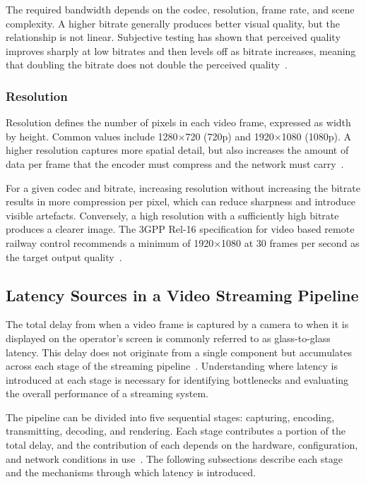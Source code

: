 The required bandwidth depends on the codec, resolution, frame rate, and scene complexity. A higher bitrate generally produces better visual quality, but the relationship is not linear. Subjective testing has shown that perceived quality improves sharply at low bitrates and then levels off as bitrate increases, meaning that doubling the bitrate does not double the perceived quality~\cite{pinson2012}.
 
\subsubsection{Resolution}\label{subsubsec:resolution}
Resolution defines the number of pixels in each video frame, expressed as width by height. Common values include 1280$\times$720 (720p) and 1920$\times$1080 (1080p). A higher resolution captures more spatial detail, but also increases the amount of data per frame that the encoder must compress and the network must carry~\cite{pinson2012}.
 
For a given codec and bitrate, increasing resolution without increasing the bitrate results in more compression per pixel, which can reduce sharpness and introduce visible artefacts. Conversely, a high resolution with a sufficiently high bitrate produces a clearer image. The 3GPP Rel-16 specification for video based remote railway control recommends a minimum of 1920$\times$1080 at 30 frames per second as the target output quality~\cite{mejias2024}.

\vspace{5mm}
\subsection{Latency Sources in a Video Streaming Pipeline}\label{subsec:latency-sources}
The total delay from when a video frame is captured by a camera to when it is displayed on the operator's screen is commonly referred to as glass-to-glass latency. This delay does not originate from a single component but accumulates across each stage of the streaming pipeline~\cite{dobrian2011}. Understanding where latency is introduced at each stage is necessary for identifying bottlenecks and evaluating the overall performance of a streaming system.
 
The pipeline can be divided into five sequential stages: capturing, encoding, transmitting, decoding, and rendering. Each stage contributes a portion of the total delay, and the contribution of each depends on the hardware, configuration, and network conditions in use~\cite{kaknjo2018}. The following subsections describe each stage and the mechanisms through which latency is introduced.

